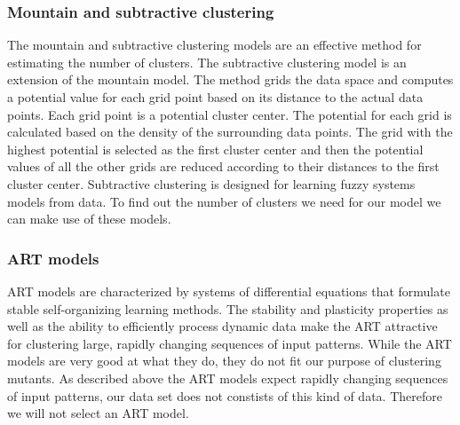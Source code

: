 \documentclass[../../main]{subfiles}
\begin{document}
\subsubsection{Mountain and subtractive clustering}
The mountain and subtractive clustering models are an effective method for estimating the number of clusters\cite{Du2010Clustering:Approach}. 
The subtractive clustering model is an extension of the mountain model\cite{Du2010Clustering:Approach}. 
\newline
The method grids the data space and computes a potential value for each grid point based on its distance to the actual data points. Each grid point is a potential cluster center. The potential for each grid is calculated based on the density of the surrounding data points. The grid with the highest potential is selected as the first cluster center and then the potential values of all the other grids are reduced according to their distances to the first cluster center.
\newline
Subtractive clustering is designed for learning fuzzy systems models from data\cite{Chiu1994FuzzyEstimation}. 
To find out the number of clusters we need for our model we can make use of these models.

\subsubsection{ART models}
ART models are characterized by systems of differential equations that formulate stable self-organizing learning methods\cite{Du2010Clustering:Approach}.
The stability and plasticity properties as well as the ability to efficiently process dynamic data make the ART attractive for clustering large, rapidly changing sequences of input patterns\cite{Du2010Clustering:Approach}.
While the ART models are very good at what they do, they do not fit our purpose of clustering mutants.
As described above the ART models expect rapidly changing sequences of input patterns, our data set does not constists of this kind of data.
Therefore we will not select an ART model.
\end{document}
